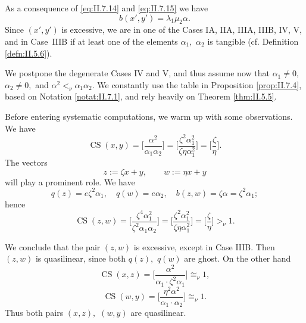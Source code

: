 \documentclass [12pt,a4paper,reqno]{amsart}
\begin{document}
As a consequence of \eqref{eq:II.7.14}  and \eqref{eq:II.7.15} we have
\begin{equation}\label{eq:II.7.16}
b(x', y') = {\lambda}_1 \mu_2 {\alpha}.
\end{equation}
Since $(x',y')$ is excessive, we are in one of the Cases IA, IIA, IIIA, IIIB, IV, V, and in Case~IIIB if at least one of the elements ${\alpha}_1,$ ${\alpha}_2$   is tangible (cf. Definition \ref{defn:II.5.6}).

We postpone the degenerate Cases IV and V, and thus assume now that ${\alpha}_1 \neq 0,$   ${\alpha}_2 \neq 0,$ and ${\alpha}^2 {<_\nu} {\alpha}_1 {\alpha}_2.$ We constantly use the table in Proposition \ref{prop:II.7.4}, based on Notation \ref{notat:II.7.1}, and rely heavily  on Theorem \ref{thm:II.5.5}.

Before entering  systematic computations, we warm up with some observations. We have
\begin{equation}\label{eq:II.7.17}
{\operatorname{CS}}(x,y) = \bigg[ \frac{{\alpha}^2}{ {\alpha}_1 {\alpha}_2} \bigg]  = \bigg[ \frac{{\zeta}^ 2 {\alpha}_1^2 }{ {\zeta} \eta {\alpha}_1^2} \bigg] = \bigg[ \frac{\zeta}{ \eta} \bigg].
\end{equation}
The vectors
\begin{equation}\label{eq:II.7.18}
z := {\zeta} x + y, \qquad w := \eta x + y
\end{equation}
will play a prominent role. We have $$q(z) = e {\zeta}^2 {\alpha}_1, \quad q(w) = e {\alpha}_2, \quad b(z,w) = {\zeta} {\alpha} = {\zeta}^2 {\alpha}_1;$$ hence
\begin{equation}\label{eq:II.7.19}
{\operatorname{CS}}(z,w) = \bigg[ \frac{{\zeta}^4 {\alpha}_1^2}{ {\zeta}^2 {\alpha}_1 {\alpha}_2} \bigg]  = \bigg[ \frac{{\zeta}^ 2 {\alpha}_1^2 }{ {\zeta} \eta {\alpha}_1^2} \bigg] = \bigg[ \frac{\zeta}{ \eta} \bigg] {>_\nu} 1.
\end{equation}

We conclude that the pair $(z,w)$ is excessive, except in  Case IIIB.  Then $(z,w)$ is quasilinear, since both $q(z),$ $q(w)$ are ghost. On the other hand
\begin{equation}\label{eq:II.7.20}
{\operatorname{CS}}(x,z) = \bigg[ \frac{{\alpha}^2}{ {\alpha}_1 \cdot {\zeta}^2 {\alpha}_1} \bigg]  {\cong_\nu} 1,
\end{equation}
\begin{equation}\label{eq:II.7.21}
{\operatorname{CS}}(w,y) = \bigg[ \frac{\eta ^2 {\alpha}^2}{ {\alpha}_1 \cdot {\alpha}_2} \bigg]  {\cong_\nu} 1.
\end{equation}
Thus both pairs $(x,z),$ $(w,y)$ are quasilinear.
\end{document}
